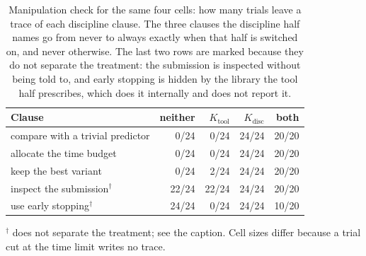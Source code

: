 \begin{table}[t]
\centering
\caption{Manipulation check for the same four cells: how many trials leave a trace of each discipline clause. The three clauses the discipline half names go from never to always exactly when that half is switched on, and never otherwise. The last two rows are marked because they do not separate the treatment: the submission is inspected without being told to, and early stopping is hidden by the library the tool half prescribes, which does it internally and does not report it.}
\label{tab:clauses}
\small
\begin{tabular}{lrrrr}
\toprule
Clause & neither & $K_{\text{tool}}$ & $K_{\text{disc}}$ & both \\
\midrule
compare with a trivial predictor & 0/24 & 0/24 & 24/24 & 20/20 \\
allocate the time budget & 0/24 & 0/24 & 24/24 & 20/20 \\
keep the best variant & 0/24 & 2/24 & 24/24 & 20/20 \\
inspect the submission$^{\dagger}$ & 22/24 & 22/24 & 24/24 & 20/20 \\
use early stopping$^{\dagger}$ & 24/24 & 0/24 & 24/24 & 10/20 \\
\bottomrule
\end{tabular}
\par\smallskip
\begin{minipage}{0.92\linewidth}\footnotesize $^{\dagger}$ does not separate the treatment; see the caption. Cell sizes differ because a trial cut at the time limit writes no trace.\end{minipage}
\end{table}
